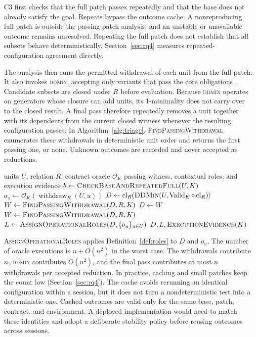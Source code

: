 \documentclass[a4paper,fleqn]{cas-sc}
\newcommand{\lab}[1]{\textsf{#1}}
\newcommand{\cl}{\operatorname{cl}}
\newcommand{\withdraw}{\operatorname{withdraw}}
\newcommand{\Valid}{\operatorname{Valid}}
\begin{document}
C3 first checks that the full patch passes repeatedly and that the base does not already satisfy the goal. Repeats bypass the outcome cache. A nonreproducing full patch is outside the passing-patch analysis, and an unstable or unavailable outcome remains unresolved. Repeating the full patch does not establish that all subsets behave deterministically. Section~\ref{sec:rq4} measures repeated-configuration agreement directly.

The analysis then runs the permitted withdrawal of each unit from the full patch. It also invokes \textsc{ddmin}, accepting only variants that pass the core obligations~\citep{zeller2002ddmin}. Candidate subsets are closed under $R$ before evaluation. Because \textsc{ddmin} operates on generators whose closure can add units, its 1-minimality does not carry over to the closed result. A final pass therefore repeatedly removes a unit together with its dependents from the current closed witness whenever the resulting configuration passes. In Algorithm~\ref{alg:triage}, \textsc{FindPassingWithdrawal} enumerates these withdrawals in deterministic unit order and returns the first passing one, or \lab{none}. Unknown outcomes are recorded and never accepted as reductions.

\begin{algorithm}[tbp]
\caption{Dependency-aware counterfactual triage (C3)}\label{alg:triage}
\begin{algorithmic}[1]
\Require units $U$, relation $R$, contract oracle $\mathcal{O}_K$
\Ensure passing witness, contextual roles, and execution evidence
\State $b\gets\Call{CheckBaseAndRepeatedFull}{U,K}$
  \State \Return {}
\EndIf
{}
  \State $o_u\gets\mathcal{O}_K(\withdraw_R(U,u))$
\EndFor
\State $D\gets\cl_R(\Call{DDMin}{U,\Valid_K\circ\cl_R})$
\State $W\gets\Call{FindPassingWithdrawal}{D,R,K}$
\While{$W\ne\lab{none}$}
  \State $D\gets W$
  \State $W\gets\Call{FindPassingWithdrawal}{D,R,K}$
\EndWhile
\State $L\gets\Call{AssignOperationalRoles}{D,\{o_u\}_{u\in U}}$
\State \Return $D,L,\Call{ExecutionEvidence}{K}$
\end{algorithmic}
\end{algorithm}

\textsc{AssignOperationalRoles} applies Definition~\ref{def:roles} to $D$ and $o_u$. The number of oracle executions is $n+O(n^2)$ in the worst case. The withdrawals contribute $n$, \textsc{ddmin} contributes $O(n^2)$, and the final pass contributes at most $n$ withdrawals per accepted reduction. In practice, caching and small patches keep the count low (Section~\ref{sec:rq4}). The cache avoids rerunning an identical configuration within a session, but it does not turn a nondeterministic test into a deterministic one. Cached outcomes are valid only for the same base, patch, contract, and environment. A deployed implementation would need to match these identities and adopt a deliberate stability policy before reusing outcomes across sessions.
\end{document}
